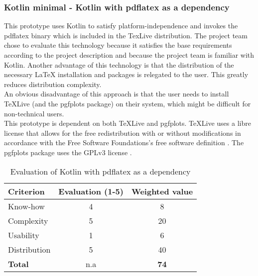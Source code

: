 \subsubsection{Kotlin minimal - Kotlin with pdflatex as a dependency}
\label{subsubsec:kotlin_minimal}
This prototype uses Kotlin to satisfy platform-independence and invokes the pdflatex binary which is included in the TexLive distribution.
The project team chose to evaluate this technology because it satisfies the base requirements according to the project description and because
the project team is familiar with Kotlin. Another advantage of this technology is that the distribution of the necessary LaTeX installation and packages is relegated to the user. This greatly reduces distribution complexity.\\
An obvious disadvantage of this approach is that the user needs to install TeXLive (and the pgfplots package) on their system, which might be difficult for non-technical users.\\
This prototype is dependent on both TeXLive and pgfplots.
TeXLive uses a libre license that allows for the free redistribution with or without modifications \cite{texlive_license} in accordance with the Free Software Foundations's free software definition \cite{fsf_free_software}.
The pgfplots package uses the GPLv3 license \cite{pgfplots}.
\begin{table}[H]
    \centering
    \begin{tabular}{|l|c|c|}
        \hline
        \textbf{Criterion} & \textbf{Evaluation (1-5)} & \textbf{Weighted value} \\
        \hline
        Know-how & 4 & 8 \\
        \hline
        Complexity & 5 & 20 \\
        \hline
        Usability & 1 & 6 \\
        \hline
        Distribution & 5 & 40 \\
        \hline
        \textbf{Total} & n.a & \textbf{74} \\
        \hline
    \end{tabular}
    \caption{Evaluation of Kotlin with pdflatex as a dependency}
    \label{table:kotlin_minimal_evaluation}
\end{table}


